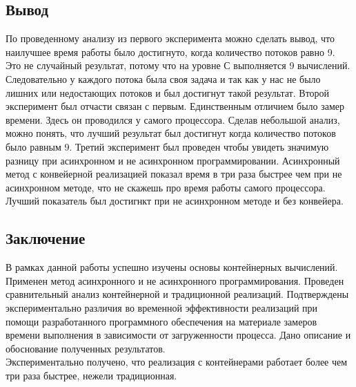 \documentclass[a4paper, 12pt]{article}
\begin{document}
\begin{flushleft}
	\subsection{Вывод}
	\hspace*{5mm} По проведенному анализу из первого эксперимента можно сделать вывод, что наилучшее время работы было достигнуто, когда количество потоков равно 9. Это не случайный результат, потому что на уровне С выполняется 9 вычислений. Следовательно у каждого потока была своя задача и так как у нас не было лишних или недостающих потоков и был достигнут такой результат. Второй эксперимент был отчасти связан с первым. Единственным отличием было замер времени. Здесь он проводился у самого процессора. Сделав небольшой анализ, можно понять, что лучший результат был достигнут когда количество потоков было равным 9. Третий эксперимент был проведен чтобы увидеть значимую разницу при асинхронном и не асинхронном программировании. Асинхронный метод с конвейерной реализацией показал время в три раза быстрее чем при не асинхронном методе, что не скажешь про время работы самого процессора. Лучший показатель был достигнкт при не асинхронном методе и без конвейера. 
\end{flushleft}

\begin{flushleft}
	\newpage
	\section*{Заключение}
	\hspace*{5mm} В рамках данной работы успешно изучены основы контейнерных вычислений. Применен метод асинхронного и не асинхронного программирования. Проведен сравнительный анализ контейнерной и традиционной реализаций. Подтверждены экспериментально различия во временной эффективности реализаций при помощи разработанного программного обеспечения на материале замеров времени выполнения в зависимости от загруженности процесса. Дано описание и обоснование полученных результатов.
	\\ \hspace*{5mm} Экспериментально получено, что реализация с контейнерами работает более чем три раза быстрее, нежели традиционная.   
\end{flushleft}

\clearpage
\newpage

\printbibliography
\end{document}
